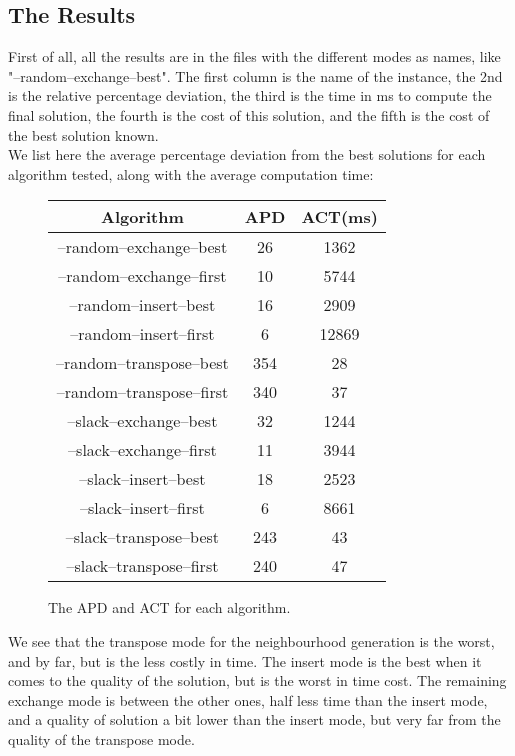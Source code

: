 \subsection{The Results}
First of all, all the results are in the files with the different modes as names, like "--random--exchange--best". The first column is the name of the instance, the 2nd is the relative percentage deviation, the third is the time in ms to compute the final solution, the fourth is the cost of this solution, and the fifth is the cost of the best solution known.\\

We list here the average percentage deviation from the best solutions for each algorithm tested, along with the average computation time:

\begin{figure}[H]
\begin{center}
	\begin{tabular}{|c|c|c|} \hline
		Algorithm & APD & ACT(ms) \\ \hline \hline
		
		--random--exchange--best		& 26		& 1362 \\ \hline
		--random--exchange--first	& 10		& 5744 \\ \hline
		--random--insert--best		& 16		& 2909 \\ \hline
		--random--insert--first		& 6		& 12869 \\ \hline
		--random--transpose--best	& 354	& 28 \\ \hline
		--random--transpose--first	& 340	& 37 \\ \hline
		--slack--exchange--best		& 32		& 1244 \\ \hline
		--slack--exchange--first		& 11		& 3944 \\ \hline
		--slack--insert--best		& 18		& 2523 \\ \hline
		--slack--insert--first		& 6		& 8661 \\ \hline
		--slack--transpose--best		& 243	& 43 \\ \hline
		--slack--transpose--first	& 240	& 47 \\ \hline
	\end{tabular}
\end{center}
\caption{The APD and ACT for each algorithm.}
\label{al}
\end{figure}

We see that the transpose mode for the neighbourhood generation is the worst, and by far, but is the less costly in time. The insert mode is the best when it comes to the quality of the solution, but is the worst in time cost. The remaining exchange mode is between the other ones, half less time than the insert mode, and a quality of solution a bit lower than the insert mode, but very far from the quality of the transpose mode.\\

